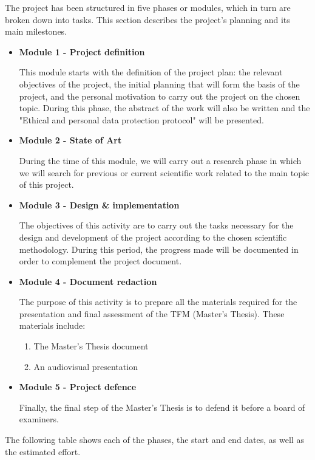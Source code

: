 The project has been structured in five phases or modules, which in turn are broken down into tasks. This section describes the project's planning and its main milestones. 
\begin{itemize}
    \item \textbf{Module 1 - Project definition} 
    
    This module starts with the definition of the project plan: the relevant objectives of the project, the initial planning that will form the basis of the project, and the personal motivation to carry out the project on the chosen topic. During this phase, the abstract of the work will also be written and the "Ethical and personal data protection protocol" will be presented.
    \item \textbf{Module 2 - State of Art}
    
    During the time of this module, we will carry out a research phase in which we will search for previous or current scientific work related to the main topic of this project.
    \item \textbf{Module 3 - Design \& implementation}
    
    The objectives of this activity are to carry out the tasks necessary for the design and development of the project according to the chosen scientific methodology. During this period, the progress made will be documented in order to complement the project document. 
    \item \textbf{Module 4 - Document redaction}
    
    The purpose of this activity is to prepare all the materials required for the presentation and final assessment of the TFM (Master's Thesis). These materials include:
    
    \begin{enumerate}
        \item The Master's Thesis document
        \item An audiovisual presentation
    \end{enumerate}

    \item \textbf{Module 5 - Project defence}
    
    Finally, the final step of the Master's Thesis is to defend it before a board of examiners.
\end{itemize}

The following table shows each of the phases, the start and end dates, as well as the estimated effort.


